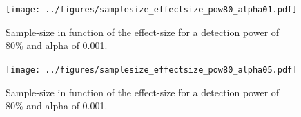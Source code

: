 \documentclass[authoryear]{elsarticle}
\begin{document}
\pagebreak
% 
% 



% 






\begin{figure}[tbp]
\centering
\texttt{[image: ../figures/samplesize\_effectsize\_pow80\_alpha01.pdf]}
\caption[]{
Sample-size in function of the effect-size for a detection power of 80\% and alpha of 0.001.
}
\label{fig_sampeffect_curves_alpha01}
\end{figure}
\begin{figure}[tbp]
\centering
\texttt{[image: ../figures/samplesize\_effectsize\_pow80\_alpha05.pdf]}
\caption[]{
Sample-size in function of the effect-size for a detection power of 80\% and alpha of 0.001.
}
\label{fig_sampeffect_curves_alpha05}
\end{figure}
\end{document}
